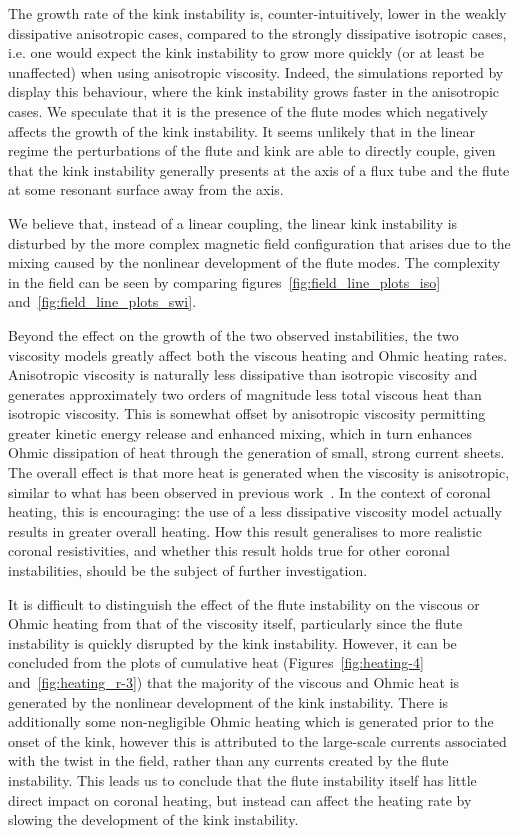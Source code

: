 \documentclass[fleqn,usenatbib]{mnras}
\newcommand{\rev}[1]{{\color{red} {#1}}}
\newcommand{\newold}[2]{{#1}{}}
\begin{document}
\rev{The growth rate of the kink instability is, counter-intuitively, lower in the
weakly dissipative anisotropic cases, compared to the strongly dissipative
isotropic cases, i.e. one would expect the kink instability to grow more
quickly (or at least be unaffected) when using anisotropic viscosity. Indeed,
the simulations reported by~\citet{quinnEffectAnisotropicViscosity2020} display
this behaviour, where the kink instability grows \newold{}{(marginally)} faster in the
anisotropic cases. We speculate that it is the presence of the flute modes which
negatively affects the growth of the kink instability.} {It seems unlikely that
in the linear regime the perturbations of the flute and kink are able to
directly couple, given that the kink instability generally presents at the axis
of a flux tube and the flute at some resonant surface away from the
axis.} \rev{We believe that, instead of a linear coupling, the linear kink instability is
disturbed by the more complex magnetic field configuration that arises due to
the mixing caused by the nonlinear development of the flute modes. The
complexity in the field can be seen by comparing
figures~\ref{fig:field_line_plots_iso} and~\ref{fig:field_line_plots_swi}.

Beyond the effect on the growth of the two observed instabilities, the two
viscosity models greatly affect both the viscous heating and Ohmic heating
rates. Anisotropic viscosity is naturally less dissipative than isotropic
viscosity and generates approximately two orders of magnitude less total
viscous heat than isotropic viscosity. This is somewhat offset by anisotropic
viscosity permitting greater kinetic energy release and enhanced mixing, which
in turn enhances Ohmic dissipation of heat through the generation of small,
strong current sheets. The overall effect is that more heat is generated when
the viscosity is anisotropic, similar to what has been observed in previous
work~\citep{quinnEffectAnisotropicViscosity2020}. In the context of
coronal heating, this is encouraging: the use of a less dissipative viscosity
model actually results in greater overall heating. How this result generalises
to more realistic coronal resistivities, and whether this result holds true for
other coronal instabilities, should be the subject of further investigation.}

\rev{It is difficult to distinguish the effect of the flute instability on the
viscous or Ohmic heating from that of the viscosity itself, particularly since
the flute instability is quickly disrupted by the kink instability. However, it
can be concluded from the plots of cumulative heat (Figures~\ref{fig:heating-4}
and~\ref{fig:heating_r-3}) that the majority of the viscous and Ohmic heat is
generated by the nonlinear development of the kink instability. There is
additionally some non-negligible Ohmic heating which is generated prior to the
onset of the kink, however this is attributed to the large-scale currents
associated with the twist in the field, rather than any currents created by the
flute instability. This leads us to conclude that the flute instability itself
has little direct impact on coronal heating, but instead can affect the heating
rate by slowing the development of the kink instability.}
\end{document}
